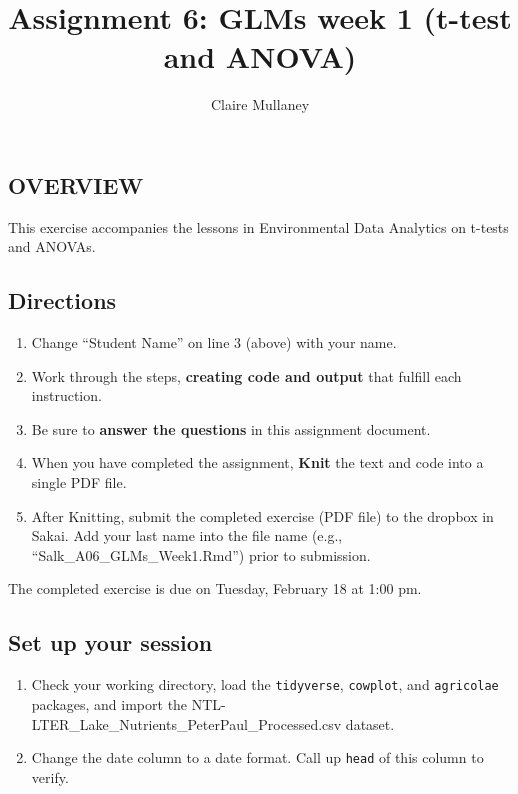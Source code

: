 \documentclass[]{article}
\title{Assignment 6: GLMs week 1 (t-test and ANOVA)}
\author{Claire Mullaney}
\date{}
\providecommand{\tightlist}{%
  \setlength{\itemsep}{0pt}\setlength{\parskip}{0pt}}
\begin{document}
\maketitle

\hypertarget{overview}{%
\subsection{OVERVIEW}\label{overview}}

This exercise accompanies the lessons in Environmental Data Analytics on
t-tests and ANOVAs.

\hypertarget{directions}{%
\subsection{Directions}\label{directions}}

\begin{enumerate}
\def\labelenumi{\arabic{enumi}.}
\tightlist
\item
  Change ``Student Name'' on line 3 (above) with your name.
\item
  Work through the steps, \textbf{creating code and output} that fulfill
  each instruction.
\item
  Be sure to \textbf{answer the questions} in this assignment document.
\item
  When you have completed the assignment, \textbf{Knit} the text and
  code into a single PDF file.
\item
  After Knitting, submit the completed exercise (PDF file) to the
  dropbox in Sakai. Add your last name into the file name (e.g.,
  ``Salk\_A06\_GLMs\_Week1.Rmd'') prior to submission.
\end{enumerate}

The completed exercise is due on Tuesday, February 18 at 1:00 pm.

\hypertarget{set-up-your-session}{%
\subsection{Set up your session}\label{set-up-your-session}}

\begin{enumerate}
\def\labelenumi{\arabic{enumi}.}
\item
  Check your working directory, load the \texttt{tidyverse},
  \texttt{cowplot}, and \texttt{agricolae} packages, and import the
  NTL-LTER\_Lake\_Nutrients\_PeterPaul\_Processed.csv dataset.
\item
  Change the date column to a date format. Call up \texttt{head} of this
  column to verify.
\end{enumerate}
\end{document}
